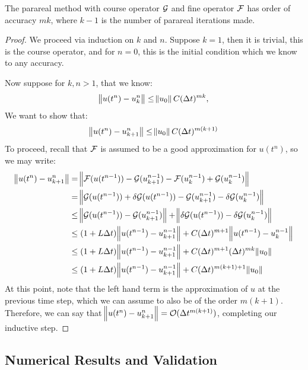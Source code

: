 \begin{theorem*}
  The parareal method with course operator $\mathcal{G}$ and fine operator $\mathcal{F}$
  has order of accuracy $mk$, where $k-1$ is the number of parareal iterations
  made. \cite{balarticle} \cite{fieldstalk}
\end{theorem*}
\begin{proof}
  We proceed via induction on $k$ and $n$. Suppose $k = 1$, then it is trivial,
  this is the course operator, and for $n = 0$, this is the initial condition
  which we know to any accuracy.

  Now suppose for $k,n > 1$, that we know:
  \[
    \norm{u(t^n) - u_k^n} \leq \norm{u_0}C(\Delta t)^{mk}, 
  \]
  We want to show that:
  \[
    \norm{u(t^n) - u_{k+1}^n} \leq \norm{u_0}C(\Delta t)^{m(k+1)}
  \]
  To proceed, recall that $\mathcal{F}$ is assumed to be a good approximation for
  $u(t^n)$, so we may write:
  \begin{align*}
    \norm{u(t^n) - u_{k+1}^n} & = \norm{\mathcal{F}(u(t^{n-1})) -
    \mathcal{G}(u^{n-1}_{k+1}) - \mathcal{F}(u^{n-1}_k) + \mathcal{G}(u^{n-1}_k)} \\
    & = \norm{\mathcal{G}(u(t^{n-1})) + \delta \mathcal{G} (u(t^{n-1}))  -
    \mathcal{G}(u^{n-1}_{k+1}) - \delta \mathcal{G}(u^{n-1}_k)} \\
    & \leq \norm{\mathcal{G}(u(t^{n-1})) - \mathcal{G}(u^{n-1}_{k+1})} + 
    \norm{ \delta \mathcal{G} (u(t^{n-1})) - \delta \mathcal{G}(u^{n-1}_k)} \\
    & \leq (1+L\Delta t)\norm{u(t^{n-1}) - u^{n-1}_{k+1}} + 
    C(\Delta t)^{m+1}\norm{ u(t^{n-1}) - u^{n-1}_k} \\
    & \leq (1+L\Delta t)\norm{u(t^{n-1}) - u^{n-1}_{k+1}} + 
    C(\Delta t)^{m+1}(\Delta t)^{mk}\norm{ u_0 } \\
    & \leq (1+L\Delta t)\norm{u(t^{n-1}) - u^{n-1}_{k+1}} + 
    C(\Delta t)^{m(k+1)+1}\norm{ u_0 } \\
  \end{align*}
  At this point, note that the left hand term is the approximation of $u$ at the
  previous time step, which we can assume to also be of the order $m(k+1)$.
  Therefore, we can say that $\norm{u(t^n) - u_{k+1}^n} = \mathcal{O}(\Delta
  t^{m(k+1)})$, completing our inductive step.
\end{proof}

\subsection{Numerical Results and Validation}

